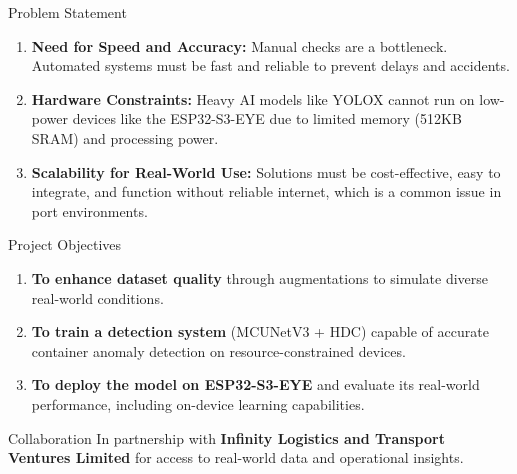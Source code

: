 \documentclass{beamer}
\begin{document}
\begin{frame}{Problem Statement}
    \begin{enumerate}
        \item \textbf{Need for Speed and Accuracy:} Manual checks are a bottleneck. Automated systems must be fast and reliable to prevent delays and accidents.
        \item \textbf{Hardware Constraints:} Heavy AI models like YOLOX cannot run on low-power devices like the ESP32-S3-EYE due to limited memory (512KB SRAM) and processing power.
        \item \textbf{Scalability for Real-World Use:} Solutions must be cost-effective, easy to integrate, and function without reliable internet, which is a common issue in port environments.
    \end{enumerate}
\end{frame}

\begin{frame}{Project Objectives}
    \begin{enumerate}
        \item \textbf{To enhance dataset quality} through augmentations to simulate diverse real-world conditions.
        \item \textbf{To train a detection system} (MCUNetV3 + HDC) capable of accurate container anomaly detection on resource-constrained devices.
        \item \textbf{To deploy the model on ESP32-S3-EYE} and evaluate its real-world performance, including on-device learning capabilities.
    \end{enumerate}
    \vspace{1cm}
    \begin{block}{Collaboration}
        In partnership with \textbf{Infinity Logistics and Transport Ventures Limited} for access to real-world data and operational insights.
    \end{block}
\end{frame}

\end{document}
